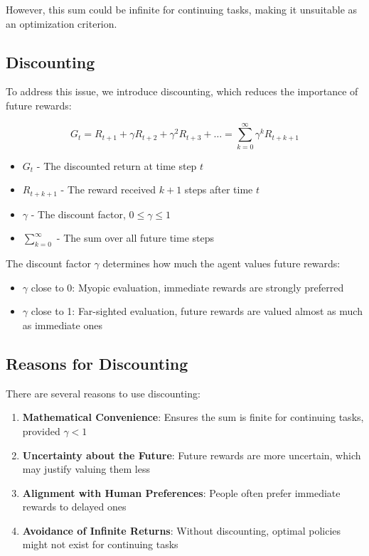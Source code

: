 \documentclass[12pt,a4paper]{article}
\begin{document}
However, this sum could be infinite for continuing tasks, making it unsuitable as an optimization criterion.

\subsection{Discounting}

To address this issue, we introduce discounting, which reduces the importance of future rewards:

\begin{equation}
G_t = R_{t+1} + \gamma R_{t+2} + \gamma^2 R_{t+3} + \ldots = \sum_{k=0}^{\infty} \gamma^k R_{t+k+1}
\end{equation}

\begin{tcolorbox}[title=Notation Overview]
\begin{itemize}
    \item $G_t$ - The discounted return at time step $t$
    \item $R_{t+k+1}$ - The reward received $k+1$ steps after time $t$
    \item $\gamma$ - The discount factor, $0 \leq \gamma \leq 1$
    \item $\sum_{k=0}^{\infty}$ - The sum over all future time steps
\end{itemize}
\end{tcolorbox}

The discount factor $\gamma$ determines how much the agent values future rewards:
\begin{itemize}
    \item $\gamma$ close to 0: Myopic evaluation, immediate rewards are strongly preferred
    \item $\gamma$ close to 1: Far-sighted evaluation, future rewards are valued almost as much as immediate ones
\end{itemize}

\subsection{Reasons for Discounting}

There are several reasons to use discounting:

\begin{enumerate}
    \item \textbf{Mathematical Convenience}: Ensures the sum is finite for continuing tasks, provided $\gamma < 1$
    \item \textbf{Uncertainty about the Future}: Future rewards are more uncertain, which may justify valuing them less
    \item \textbf{Alignment with Human Preferences}: People often prefer immediate rewards to delayed ones
    \item \textbf{Avoidance of Infinite Returns}: Without discounting, optimal policies might not exist for continuing tasks
\end{enumerate}
\end{document}
